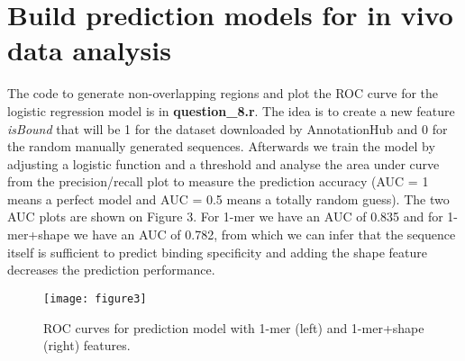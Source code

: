 \documentclass[11pt]{article}
\begin{document}
\section{Build prediction models for in vivo data analysis}
The code to generate non-overlapping regions and plot the ROC curve for the logistic regression model is in \textbf{question\_8.r}. The idea is to create a new feature \emph{isBound} that will be 1 for the dataset downloaded by AnnotationHub and 0 for the random manually generated sequences. Afterwards we train the model by adjusting a logistic function and a threshold and analyse the area under curve from the precision/recall plot to measure the prediction accuracy (AUC = 1 means a perfect model and AUC = 0.5 means a totally random guess). The two AUC plots are shown on Figure 3. For 1-mer we have an AUC of 0.835 and for 1-mer+shape we have an AUC of 0.782, from which we can infer that the sequence itself is sufficient to predict binding specificity and adding the shape feature decreases the prediction performance. 
\begin{figure}
\texttt{[image: figure3]}
\caption{ROC curves for prediction model with 1-mer (left) and 1-mer+shape (right) features. }
\end{figure}
\end{document}
